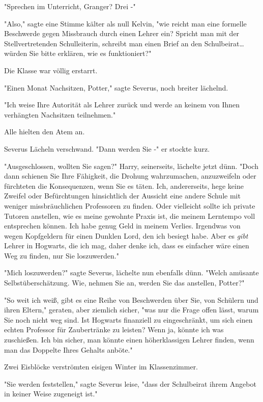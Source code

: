 {"Sprechen im Unterricht, Granger? Drei -"

"Also," sagte eine Stimme kälter als null Kelvin, "wie reicht man eine formelle Beschwerde gegen Missbrauch durch einen Lehrer ein? Spricht man mit der Stellvertretenden Schulleiterin, schreibt man einen Brief an den Schulbeirat… würden Sie bitte erklären, wie es funktioniert?"

Die Klasse war völlig erstarrt.

"Einen Monat Nachsitzen, Potter," sagte Severus, noch breiter lächelnd.

"Ich weise Ihre Autorität als Lehrer zurück und werde an keinem von Ihnen verhängten Nachsitzen teilnehmen."

Alle hielten den Atem an.

Severus Lächeln verschwand. "Dann werden Sie -" er stockte kurz.

"Ausgeschlossen, wollten Sie sagen?" Harry, seinerseits, lächelte jetzt dünn. "Doch dann schienen Sie Ihre Fähigkeit, die Drohung wahrzumachen, anzuzweifeln oder fürchteten die Konsequenzen, wenn Sie es täten. Ich, andererseits, hege keine Zweifel oder Befürchtungen hinsichtlich der Aussicht eine andere Schule mit weniger missbräuchlichen Professoren zu finden. Oder vielleicht sollte ich private Tutoren anstellen, wie es meine gewohnte Praxis ist, die meinem Lerntempo voll entsprechen können. Ich habe genug Geld in meinem Verlies. Irgendwas von wegen Kopfgeldern für einen Dunklen Lord, den ich besiegt habe. Aber es \emph{gibt} Lehrer in Hogwarts, die ich mag, daher denke ich, dass es einfacher wäre einen Weg zu finden, nur Sie loszuwerden."

"Mich loszuwerden?" sagte Severus, lächelte nun ebenfalls dünn. "Welch amüsante Selbstüberschätzung. Wie, nehmen Sie an, werden Sie das anstellen, Potter?"

"So weit ich weiß, gibt es eine Reihe von Beschwerden über Sie, von Schülern und ihren Eltern," geraten, aber ziemlich sicher, "was nur die Frage offen lässt, warum Sie noch nicht weg sind. Ist Hogwarts finanziell zu eingeschränkt, um sich einen echten Professor für Zaubertränke zu leisten? Wenn ja, könnte ich was zuschießen. Ich bin sicher, man könnte einen höherklassigen Lehrer finden, wenn man das Doppelte Ihres Gehalts anböte."

Zwei Eisblöcke verströmten eisigen Winter im Klassenzimmer.

"Sie werden feststellen," sagte Severus leise, "dass der Schulbeirat ihrem Angebot in keiner Weise zugeneigt ist."

}
